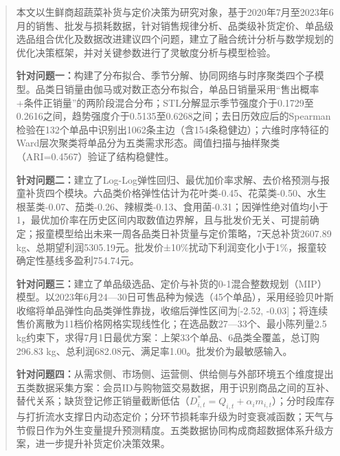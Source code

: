 \begin{abstract}

本文以生鲜商超蔬菜补货与定价决策为研究对象，基于2020年7月至2023年6月的销售、批发与损耗数据，针对销售规律分析、品类级补货定价、单品级选品组合优化及数据改进建议四个问题，建立了融合统计分析与数学规划的优化决策框架，并对关键参数进行了灵敏度分析与模型检验。

\textbf{针对问题一：}构建了分布拟合、季节分解、协同网络与时序聚类四个子模型。品类日销量由伽马或对数正态分布拟合，单品日销量采用“售出概率+条件正销量”的两阶段混合分布；STL分解显示季节强度介于0.1729至0.2616之间，趋势强度介于0.5135至0.6268之间；去日历效应后的Spearman检验在132个单品中识别出1062条主边（含154条稳健边）；六维时序特征的Ward层次聚类将单品分为五类需求形态。阈值扫描与抽样聚类（ARI=0.4567）验证了结构稳健性。

\textbf{针对问题二：}建立了Log-Log弹性回归、最优加价率求解、去价格预测与报童补货四个模块。六品类价格弹性估计为花叶类-0.45、花菜类-0.50、水生根茎类-0.07、茄类-0.26、辣椒类-0.13、食用菌-0.31；因弹性绝对值均小于1，最优加价率在历史区间内取数值边界解，且与批发价无关、可提前确定；报童模型给出未来一周各品类日补货量与定价策略，7天总补货2607.89 kg、总期望利润5305.19元。批发价±10\%扰动下利润变化小于1\%，报童较确定性基线多盈利754.74元。

\textbf{针对问题三：}建立了单品级选品、定价与补货的0-1混合整数规划（MIP）模型。以2023年6月24—30日可售品种为候选（45个单品），采用经验贝叶斯收缩将单品弹性向品类弹性靠拢，收缩后弹性区间为[-2.52, -0.03]；将连续售价离散为11档价格网格实现线性化；在选品数27—33个、最小陈列量2.5 kg约束下，求得7月1日最优方案：上架33个单品、6品类全覆盖，总订购296.83 kg、总利润682.08元、满足率1.00。批发价为最敏感输入。

\textbf{针对问题四：}从需求侧、市场侧、运营侧、供给侧与外部环境五个维度提出五类数据采集方案：会员ID与购物篮交易数据，用于识别商品之间的互补、替代关系；缺货登记修正销量截断低估（$D_{i,t}^*=Q_{i,t}+\alpha_i m_{i,t}$）；分时段库存与打折流水支撑日内动态定价；分环节损耗率升级为时变衰减函数；天气与节假日作为外生变量提升预测精度。五类数据协同构成商超数据体系升级方案，进一步提升补货定价决策效果。


\end{abstract}
